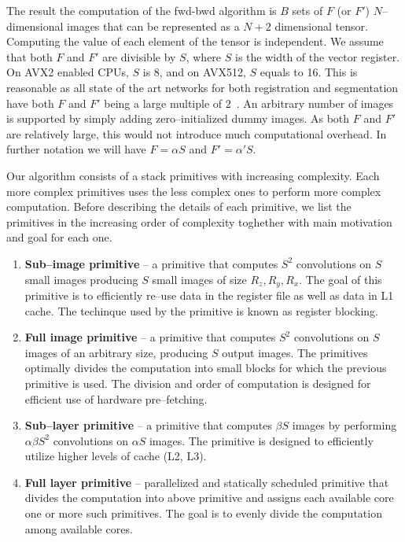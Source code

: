   The result the computation of the fwd-bwd algorithm is $B$ sets of
  $F$ (or $F'$) $N$--dimensional images that can be represented as a
  $N+2$ dimensional tensor.  Computing the value of each element of
  the tensor is independent.  We assume that both $F$ and $F'$ are
  divisible by $S$, where $S$ is the width of the vector register.  On
  AVX2 enabled CPUs, $S$ is 8, and on AVX512, $S$ equals to 16.  This
  is reasonable as all state of the art networks for both registration
  and segmentation have both $F$ and $F'$ being a large multiple of
  $2$~\cite{krizhevsky2012imagenet, ronneberger2015u,
    simonyan2014very, sermanet2013overfeat, long2015fully,
    tran2015learning, ji20133d, maturana_iros_2015,
    maturana_icra_2014}.  An arbitrary number of images is supported
  by simply adding zero--initialized dummy images.  As both $F$ and
  $F'$ are relatively large, this would not introduce much
  computational overhead.  In further notation we will have $F =
  \alpha S$ and $F' = \alpha' S$.

  Our algorithm consists of a stack primitives with increasing
  complexity.  Each more complex primitives uses the less complex ones
  to perform more complex computation.  Before describing the details
  of each primitive, we list the primitives in the increasing order of
  complexity toghether with main motivation and goal for each one.

  \begin{enumerate}
  \item {\bf Sub--image primitive} -- a primitive that computes $S^2$
    convolutions on $S$ small images producing $S$ small images of
    size $R_z, R_y, R_x$.  The goal of this primitive is to
    efficiently re--use data in the register file as well as data in
    L1 cache.  The techinque used by the primitive is known as
    register blocking.
  \item {\bf Full image primitive} -- a primitive that computes $S^2$
    convolutions on $S$ images of an arbitrary size, producing $S$
    output images.  The primitives optimally divides the computation
    into small blocks for which the previous primitive is used.  The
    division and order of computation is designed for efficient use of
    hardware pre--fetching.
  \item {\bf Sub--layer primitive} -- a primitive that computes
    $\beta S$ images by performing $\alpha \beta S^2$
    convolutions on $\alpha S$ images.  The primitive is designed to
    efficiently utilize higher levels of cache (L2, L3).
  \item {\bf Full layer primitive} -- parallelized and statically
    scheduled primitive that divides the computation into above
    primitive and assigns each available core one or more such
    primitives.  The goal is to evenly divide the computation among
    available cores.
  \end{enumerate}

